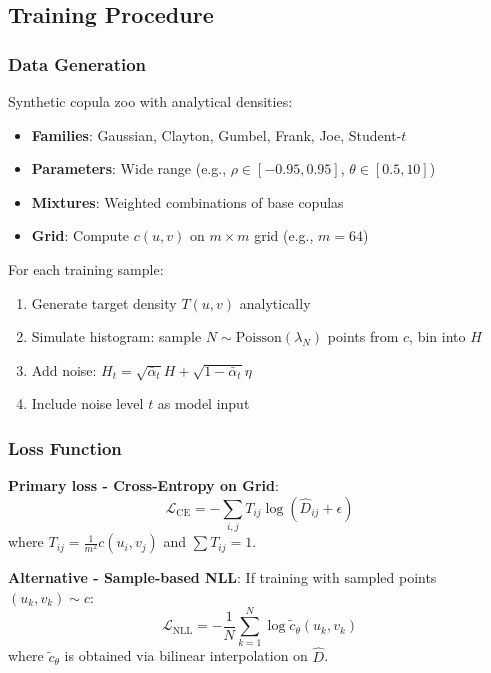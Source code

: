 \documentclass[11pt]{article}
\begin{document}
\subsection{Training Procedure}

\subsubsection{Data Generation}

Synthetic copula zoo with analytical densities:
\begin{itemize}
    \item \textbf{Families}: Gaussian, Clayton, Gumbel, Frank, Joe, Student-$t$
    \item \textbf{Parameters}: Wide range (e.g., $\rho \in [-0.95, 0.95]$, $\theta \in [0.5, 10]$)
    \item \textbf{Mixtures}: Weighted combinations of base copulas
    \item \textbf{Grid}: Compute $c(u,v)$ on $m \times m$ grid (e.g., $m=64$)
\end{itemize}

For each training sample:
\begin{enumerate}
    \item Generate target density $T(u,v)$ analytically
    \item Simulate histogram: sample $N \sim \text{Poisson}(\lambda_N)$ points from $c$, bin into $H$
    \item Add noise: $H_t = \sqrt{\bar{\alpha}_t} H + \sqrt{1-\bar{\alpha}_t} \eta$
    \item Include noise level $t$ as model input
\end{enumerate}

\subsubsection{Loss Function}

\textbf{Primary loss - Cross-Entropy on Grid}:
\begin{equation}
\mathcal{L}_{\text{CE}} = -\sum_{i,j} T_{ij} \log(\hat{D}_{ij} + \epsilon)
\end{equation}
where $T_{ij} = \frac{1}{m^2} c(u_i, v_j)$ and $\sum T_{ij} = 1$.

\textbf{Alternative - Sample-based NLL}:
If training with sampled points $(u_k, v_k) \sim c$:
\begin{equation}
\mathcal{L}_{\text{NLL}} = -\frac{1}{N} \sum_{k=1}^N \log \tilde{c}_\theta(u_k, v_k)
\end{equation}
where $\tilde{c}_\theta$ is obtained via bilinear interpolation on $\hat{D}$.
\end{document}
